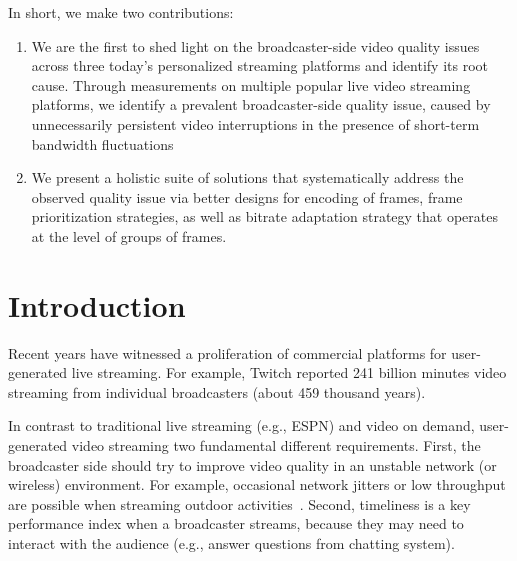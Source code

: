 In short, we make two contributions:
\begin{enumerate}
\item We are the first to shed light on the broadcaster-side video 
quality issues across three today's personalized streaming platforms and 
identify its root cause.
Through measurements on multiple popular live video streaming platforms, 
we identify a prevalent broadcaster-side quality issue, caused
by unnecessarily persistent video interruptions in the presence of short-term
bandwidth fluctuations
\item We present a holistic suite of solutions that systematically address
the observed quality issue via better designs for encoding of frames, 
frame prioritization strategies, as well as bitrate adaptation strategy that 
operates at the level of groups of frames.

\end{enumerate}


\iffalse

\section{Introduction}
Recent years have witnessed a proliferation of commercial platforms for user-generated live streaming. For example, Twitch reported 241 billion minutes video streaming from individual broadcasters (about 459 thousand years).

In contrast to traditional live streaming (e.g., ESPN) and video on demand, user-generated video streaming two fundamental different requirements. First, the broadcaster side should try to improve video quality in an unstable network (or wireless) environment. For example, occasional network jitters or low throughput are possible when streaming outdoor activities~\cite{xx}. Second, timeliness is a key performance index when a broadcaster streams, because they may need to interact with the audience (e.g., answer questions from chatting system).

